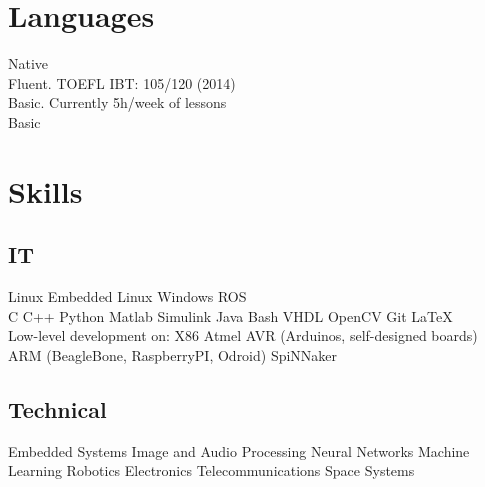 \documentclass[a4paper]{deedy-resume} %
\begin{document}
\begin{minipage}[b]{0.25\linewidth}
	
	\section{Languages}
	\vspace{2pt}
	Native\\
	\vspace{4pt}
	Fluent. TOEFL IBT: 105/120 (2014)\\
	\vspace{4pt}
	Basic. Currently 5h/week of lessons\\
	\vspace{4pt}
	Basic
	\vspace{17pt}
\end{minipage}
\hfill
\begin{minipage}[b]{0.70\linewidth}
	\section{Skills}
	\vspace{5pt}
	\subsection{IT}
	\vspace{2pt}
	Linux \textbullet{} Embedded Linux \textbullet{} Windows \textbullet{} ROS\\
	\vspace{3pt}
	C \textbullet{} C++ \textbullet{} Python \textbullet{} Matlab \textbullet{} Simulink \textbullet{} Java \textbullet{} Bash \textbullet{} VHDL \textbullet{} OpenCV \textbullet{} Git \textbullet{} \LaTeX\\
	\vspace{3pt}
	Low-level development on: X86 \textbullet{} Atmel AVR (Arduinos, self-designed boards) \textbullet{} ARM (BeagleBone, RaspberryPI, Odroid) \textbullet{} SpiNNaker
	\vspace{5pt}
	
	\subsection{Technical}
	Embedded Systems \textbullet{}
	Image and Audio Processing \textbullet{} Neural Networks \textbullet{} Machine Learning \textbullet{} Robotics \textbullet{} Electronics \textbullet{} Telecommunications \textbullet{} Space Systems
\end{minipage}
\end{document}
